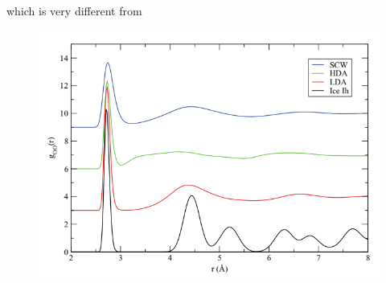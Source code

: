 \documentclass[12pt,reqno]{amsart}
\numberwithin{equation}{section}
\begin{document}
\begin{enumerate}
\begin{figure}[H]
\end{figure}
which is very different from 
\begin{figure}[H]
\centering
\includegraphics[scale=0.6]{skinner_ice}
\end{figure}
\end{enumerate}
\end{document}
